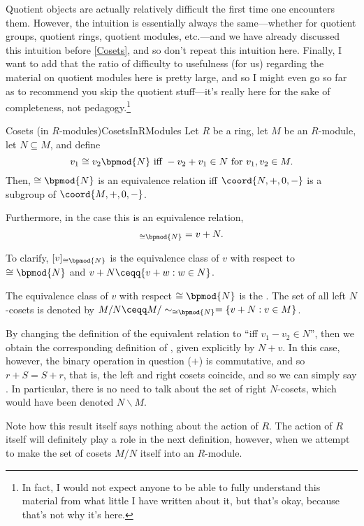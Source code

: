 Quotient objects are actually relatively difficult the first time one encounters them.  However, the intuition is essentially always the same---whether for quotient groups, quotient rings, quotient modules, etc.---and we have already discussed this intuition before \cref{Cosets}, and so don't repeat this intuition here.  Finally, I want to add that the ratio of difficulty to usefulness (for us) regarding the material on quotient modules here is pretty large, and so I might even go so far as to recommend you skip the quotient stuff---it's really here for the sake of completeness, not pedagogy.\footnote{In fact, I would not expect anyone to be able to fully understand this material from what little I have written about it, but that's okay, because that's not why it's here.}
\begin{prp}{Cosets (in $R$-modules)}{CosetsInRModules}
Let $R$ be a ring, let $M$ be an $R$-module, let $N\subseteq M$, and define
\begin{equation}
v_1\cong v_2\bpmod{N}\text{ iff }-v_2+v_1\in N\text{ for }v_1,v_2\in M.
\end{equation}
Then, $\cong \bpmod{N}$ is an equivalence relation iff $\coord{N,+,0,-}$ is a subgroup of $\coord{M,+,0,-}$.

Furthermore, in the case this is an equivalence relation,
\begin{equation}
[v]_{\cong \bpmod{N}}=v+N.
\end{equation}
\begin{rmk}
To clarify, $[v]_{\cong \bpmod{N}}$ is the equivalence class of $v$ with respect to $\cong \bpmod{N}$ and $v+N\ceqq \{ v+w:w\in N\}$.
\end{rmk}
\begin{rmk}
The equivalence class of $v$ with respect $\cong \bpmod{N}$ is the .  The set of all left $N$-cosets is denoted by $M/N\ceqq M/\sim _{\cong \bpmod{N}}=\left\{ v+N:v\in M\right\}$.
\end{rmk}
\begin{rmk}
By changing the definition of the equivalent relation to ``\textellipsis iff $v_1-v_2\in N$'', then we obtain the corresponding definition of , given explicitly by $N+v$.  In this case, however, the binary operation in question ($+$) is commutative, and so $r+S=S+r$, that is, the left and right cosets coincide, and so we can simply say .  In particular, there is no need to talk about the set of right $N$-cosets, which would have been denoted $N\backslash M$.
\end{rmk}
\begin{rmk}
Note how this result itself says nothing about the action of $R$.  The action of $R$ itself will definitely play a role in the next definition, however, when we attempt to make the set of cosets $M/N$ itself into an $R$-module.
\end{rmk}
\end{prp}
